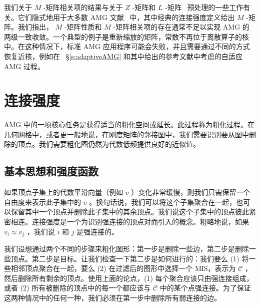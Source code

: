 \documentclass[12pt]{acta_2011xz}
\begin{document}
我们关于    $M$    -矩阵相关项的结果与关于    $Z$    -矩阵和
   $L$    -矩阵~    \cite{kraus2006algebraic,kraus2008algebraic}    预处理的一些工作有关。它们隐式地用于大多数 AMG 文献~    \cite{Ruge.J;Stuben.K.1987a}    中，其中经典的连接强度定义给出    $M$    -矩阵。我们指出，
   $M$    -矩阵性质和    $M$    -矩阵相关项的存在通常不足以实现 AMG 的两级一致收敛。一个典型的例子是重新缩放的矩阵，常数不再位于离散算子的核中。在这种情况下，标准 AMG 应用程序可能会失败，并且需要通过不同的方式恢复近核，例如在~    \S       \ref{s:adaptiveAMG}    和其中给出的参考文献中考虑的自适应 AMG 过程。  

   \section{连接强度  }       \label{sc:strength}    
   \newcommand{\cs}     { s\_c   }  AMG 中的一项核心任务是获得适当的粗化空间或延长。此过程称为粗化过程。在几何网格中，或者更一般地说，在刚度矩阵的邻接图中，我们需要识别要从图中删除的顶点。我们需要粗化图仍然为代数低频提供良好的近似值。  

   \subsection{基本思想和强度函数  }    如果顶点子集上的代数平滑向量（例如    $v$    ）变化非常缓慢，则我们只需保留一个自由度来表示此子集中的    $v$    。换句话说，我们可以将这个子集聚合在一起，也可以保留其中一个顶点并删除此子集中的其余顶点。我们说这个子集中的顶点彼此紧密相连。连接强度是一个为识别强连接的顶点对而引入的概念。粗略地说，如果
   $v_i\approx v_j$    ，我们说    $i$    和    $j$    是强连接的。  

我们设想通过两个不同的步骤来粗化图形：第一步是删除一些边，第二步是删除一些顶点。第二步是目标。让我们检查一下第二步是如何进行的：我们要么 (1) 将一些相邻顶点聚合在一起，要么 (2) 在过滤后的图形中选择一个 MIS，表示为    $\mathcal C$    ，然后删除所有剩余的顶点。使用上面的论点，(1) 每个聚合应该只由强连接组成，或者 (2) 所有被删除的顶点中的每一个都应该与    $\mathcal C$    中的某个点强连接。为了保证这两种情况中的任何一种，我们必须在第一步中删除所有弱连接的边。  
\end{document}
